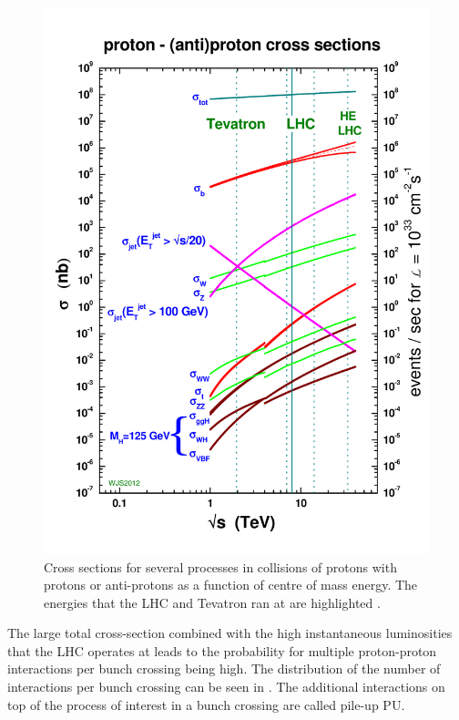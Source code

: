 \begin{figure}
  \includegraphics[width=1.2\largefigwidth]{plots/detector/crosssections2012HE_v4.pdf}
  \caption{Cross sections for several processes in collisions of protons with protons or anti-protons as a function of centre of mass energy. The energies that the LHC and Tevatron ran at are highlighted \cite{Stirlingppxs}.}
  \label{fig:xssummary}
\end{figure}

The large total cross-section combined with the high instantaneous luminosities that the LHC operates at leads to the probability for multiple proton-proton interactions per bunch crossing being high. The distribution of the number of interactions per bunch crossing can be seen in . The additional interactions on top of the process of interest in a bunch crossing are called pile-up \ac{PU}.

